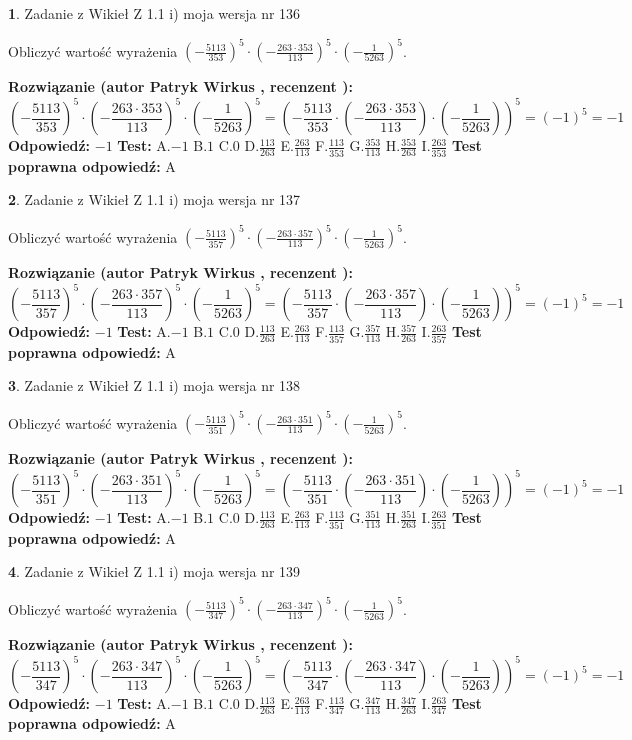 \documentclass[12pt, a4paper]{article}
\theoremstyle{definition} %
\newtheorem{zad}{}
\newcommand{\zadStart}[1]{\begin{zad}#1\newline}
\newcommand{\zadStop}{\end{zad}}
\newcommand{\rozwStart}[2]{\noindent \textbf{Rozwiązanie (autor #1 , recenzent #2): }\newline}
\newcommand{\rozwStop}{\newline}
\newcommand{\odpStart}{\noindent \textbf{Odpowiedź:}\newline}
\newcommand{\odpStop}{\newline}
\newcommand{\testStart}{\noindent \textbf{Test:}\newline}
\newcommand{\testStop}{\newline}
\newcommand{\kluczStart}{\noindent \textbf{Test poprawna odpowiedź:}\newline}
\newcommand{\kluczStop}{\newline}
\begin{document}
\zadStart{Zadanie z Wikieł Z 1.1 i) moja wersja nr 136}

Obliczyć wartość wyrażenia $(-\frac{5113}{353})^{5} \cdot (-\frac{263 \cdot 353}{113})^{5} \cdot (-\frac{1}{5263})^{5}$.
\zadStop
\rozwStart{Patryk Wirkus}{}
$$(-\frac{5113}{353})^{5} \cdot (-\frac{263 \cdot 353}{113})^{5} \cdot (-\frac{1}{5263})^{5} = (-\frac{5113}{353} \cdot (-\frac{263 \cdot 353}{113}) \cdot (-\frac{1}{5263}))^{5} = (-1)^{5} = -1$$
\rozwStop
\odpStart
$-1$
\odpStop
\testStart
A.$-1$ B.$1$ C.$0$ D.$\frac{113}{263}$ E.$\frac{263}{113}$
F.$\frac{113}{353}$ G.$\frac{353}{113}$
H.$\frac{353}{263}$
I.$\frac{263}{353}$
\testStop
\kluczStart
A
\kluczStop



\zadStart{Zadanie z Wikieł Z 1.1 i) moja wersja nr 137}

Obliczyć wartość wyrażenia $(-\frac{5113}{357})^{5} \cdot (-\frac{263 \cdot 357}{113})^{5} \cdot (-\frac{1}{5263})^{5}$.
\zadStop
\rozwStart{Patryk Wirkus}{}
$$(-\frac{5113}{357})^{5} \cdot (-\frac{263 \cdot 357}{113})^{5} \cdot (-\frac{1}{5263})^{5} = (-\frac{5113}{357} \cdot (-\frac{263 \cdot 357}{113}) \cdot (-\frac{1}{5263}))^{5} = (-1)^{5} = -1$$
\rozwStop
\odpStart
$-1$
\odpStop
\testStart
A.$-1$ B.$1$ C.$0$ D.$\frac{113}{263}$ E.$\frac{263}{113}$
F.$\frac{113}{357}$ G.$\frac{357}{113}$
H.$\frac{357}{263}$
I.$\frac{263}{357}$
\testStop
\kluczStart
A
\kluczStop



\zadStart{Zadanie z Wikieł Z 1.1 i) moja wersja nr 138}

Obliczyć wartość wyrażenia $(-\frac{5113}{351})^{5} \cdot (-\frac{263 \cdot 351}{113})^{5} \cdot (-\frac{1}{5263})^{5}$.
\zadStop
\rozwStart{Patryk Wirkus}{}
$$(-\frac{5113}{351})^{5} \cdot (-\frac{263 \cdot 351}{113})^{5} \cdot (-\frac{1}{5263})^{5} = (-\frac{5113}{351} \cdot (-\frac{263 \cdot 351}{113}) \cdot (-\frac{1}{5263}))^{5} = (-1)^{5} = -1$$
\rozwStop
\odpStart
$-1$
\odpStop
\testStart
A.$-1$ B.$1$ C.$0$ D.$\frac{113}{263}$ E.$\frac{263}{113}$
F.$\frac{113}{351}$ G.$\frac{351}{113}$
H.$\frac{351}{263}$
I.$\frac{263}{351}$
\testStop
\kluczStart
A
\kluczStop



\zadStart{Zadanie z Wikieł Z 1.1 i) moja wersja nr 139}

Obliczyć wartość wyrażenia $(-\frac{5113}{347})^{5} \cdot (-\frac{263 \cdot 347}{113})^{5} \cdot (-\frac{1}{5263})^{5}$.
\zadStop
\rozwStart{Patryk Wirkus}{}
$$(-\frac{5113}{347})^{5} \cdot (-\frac{263 \cdot 347}{113})^{5} \cdot (-\frac{1}{5263})^{5} = (-\frac{5113}{347} \cdot (-\frac{263 \cdot 347}{113}) \cdot (-\frac{1}{5263}))^{5} = (-1)^{5} = -1$$
\rozwStop
\odpStart
$-1$
\odpStop
\testStart
A.$-1$ B.$1$ C.$0$ D.$\frac{113}{263}$ E.$\frac{263}{113}$
F.$\frac{113}{347}$ G.$\frac{347}{113}$
H.$\frac{347}{263}$
I.$\frac{263}{347}$
\testStop
\kluczStart
A
\kluczStop
\end{document}
